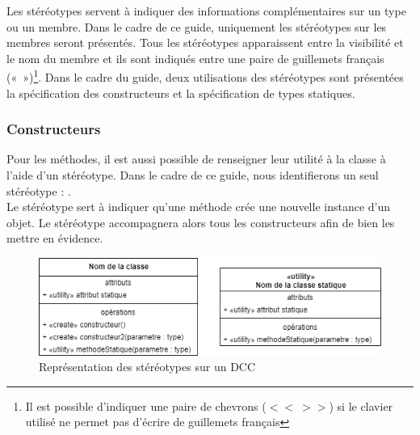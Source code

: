 Les stéréotypes servent à indiquer des informations complémentaires sur un type ou un membre. Dans le cadre de ce guide, uniquement les stéréotypes sur les membres seront présentés. Tous les stéréotypes apparaissent entre la visibilité et le nom du membre et ils sont indiqués entre une paire de guillemets français («~»)\footnote{Il est possible d'indiquer une paire de chevrons ($<<\ >>$) si le clavier utilisé ne permet pas d'écrire de guillemets français}. Dans le cadre du guide, deux utilisations des stéréotypes sont présentées la spécification des constructeurs et la spécification de types statiques.

\subsubsection{Constructeurs}

Pour les méthodes, il est aussi possible de renseigner leur utilité à la classe à l'aide d'un stéréotype. Dans le cadre de ce guide, nous identifierons un seul stéréotype : .\\

Le stéréotype  sert à indiquer qu'une méthode crée une nouvelle instance d'un objet. Le stéréotype accompagnera alors tous les constructeurs afin de bien les mettre en évidence. 

\begin{figure}[H]
	\caption{Représentation des stéréotypes sur un \acrshort{DCC}}
	\centering
	\includegraphics[scale=0.7]{dcc-statique.png}
\end{figure}

